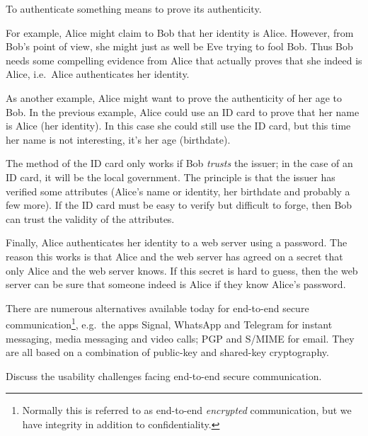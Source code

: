   \begin{solution}
    To authenticate something means to prove its authenticity.

    For example, Alice might claim to Bob that her identity is Alice.
    However, from Bob's point of view, she might just as well be Eve trying to 
    fool Bob.
    Thus Bob needs some compelling evidence from Alice that actually proves 
    that she indeed is Alice, i.e.\ Alice authenticates her identity.

    As another example, Alice might want to prove the authenticity of her age 
    to Bob.
    In the previous example, Alice could use an ID card to prove that her name 
    is Alice (her identity).
    In this case she could still use the ID card, but this time her name is not 
    interesting, it's her age (birthdate).

    The method of the ID card only works if Bob \emph{trusts} the issuer; in 
    the case of an ID card, it will be the local government.
    The principle is that the issuer has verified some attributes (Alice's name 
    or identity, her birthdate and probably a few more).
    If the ID card must be easy to verify but difficult to forge, then Bob can 
    trust the validity of the attributes.

    Finally, Alice authenticates her identity to a web server using a password.
    The reason this works is that Alice and the web server has agreed on a 
    secret that only Alice and the web server knows.
    If this secret is hard to guess, then the web server can be sure that 
    someone indeed is Alice if they know Alice's password.
  \end{solution}


  
\question[3]
  There are numerous alternatives available today for end-to-end secure 
  communication\footnote{%
    Normally this is referred to as end-to-end \emph{encrypted} communication, 
    but we have integrity in addition to confidentiality.
  }, e.g.\ the apps Signal, WhatsApp and Telegram for instant messaging, media 
  messaging and video calls; PGP and S/MIME for email.
  They are all based on a combination of public-key and shared-key cryptography.

  Discuss the usability challenges facing end-to-end secure communication.

